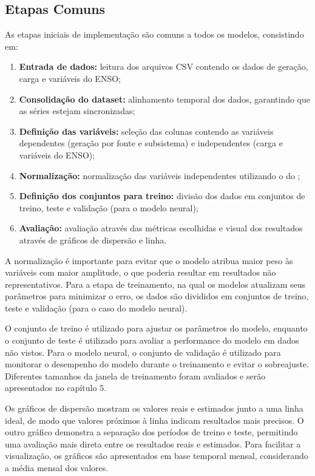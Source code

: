 \subsection{Etapas Comuns} %
As etapas iniciais de implementação são comuns a todos os modelos, consistindo em: 
\begin{enumerate}
    \item \textbf{Entrada de dados:} leitura dos arquivos CSV contendo os dados de geração, carga e variáveis do ENSO;
    \item \textbf{Consolidação do dataset:} alinhamento temporal dos dados, garantindo que as séries estejam sincronizadas;
    \item \textbf{Definição das variáveis:} seleção das colunas contendo as variáveis dependentes (geração por fonte e subsistema) e 
independentes (carga e variáveis do ENSO);
    \item \textbf{Normalização:} normalização das variáveis independentes utilizando o  do ;
    \item \textbf{Definição dos conjuntos para treino:} divisão dos dados em conjuntos de treino, teste e validação (para o modelo neural);
    \item \textbf{Avaliação:} avaliação através das métricas escolhidas e visual dos resultados através de gráficos de dispersão e linha.
\end{enumerate}

A normalização é importante para evitar que o modelo atribua maior peso às variáveis com maior amplitude,
o que poderia resultar em resultados não representativos. Para a etapa de treinamento, na qual os modelos atualizam seus parâmetros 
para minimizar o erro, os dados são divididos em conjuntos de treino, teste e validação (para o caso do modelo neural). 

O conjunto de treino é utilizado para ajustar os parâmetros 
do modelo, enquanto o conjunto de teste é utilizado para avaliar a performance do modelo em dados não vistos. Para o modelo neural, 
o conjunto de validação é utilizado para monitorar o desempenho do modelo durante o treinamento e evitar o sobreajuste. 
Diferentes tamanhos da janela de treinamento foram avaliados e serão apresentados no capítulo 5.

Os gráficos de dispersão mostram os valores reais e estimados junto a uma linha ideal, de modo que valores próximos à linha indicam 
resultados mais precisos. O outro gráfico demonstra a separação dos períodos de treino e teste, permitindo uma avaliação mais direta 
entre os resultados reais e estimados. Para facilitar a visualização, os gráficos são apresentados em base temporal mensal, 
considerando a média mensal dos valores.

